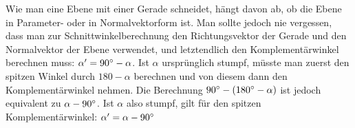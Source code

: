 \pagebreak


Wie man eine Ebene mit einer Gerade schneidet, h\"{a}ngt davon ab, ob die Ebene in Parameter- oder in Normalvektorform ist. Man sollte jedoch nie vergessen, dass man zur Schnittwinkelberechnung den Richtungsvektor der Gerade und den Normalvektor der Ebene verwendet, und letztendlich den Komplement\"{a}rwinkel berechnen muss: $\alpha' = 90\degree - \alpha$. Ist $\alpha$ urspr\"{u}nglich stumpf, m\"{u}sste man zuerst den spitzen Winkel durch $180 - \alpha$ berechnen und von diesem dann den Komplement\"{a}rwinkel nehmen. Die Berechnung $90\degree - (180\degree - \alpha)$ ist jedoch equivalent zu $\alpha - 90\degree$. Ist $\alpha$ also stumpf, gilt f\"{u}r den spitzen Komplement\"{a}rwinkel: $\alpha' = \alpha - 90\degree$


